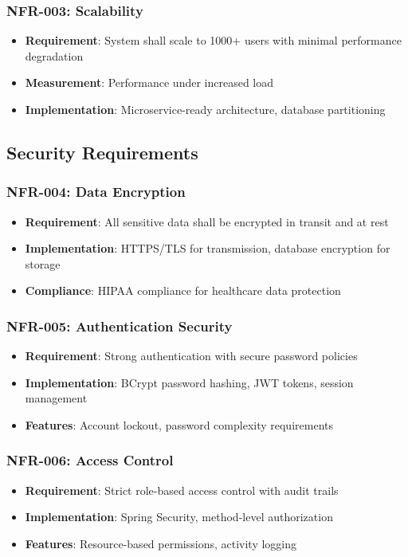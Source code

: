 \documentclass[12pt,a4paper]{article}
\begin{document}
\subsubsection{NFR-003: Scalability}
\begin{itemize}
    \item \textbf{Requirement}: System shall scale to 1000+ users with minimal performance degradation
    \item \textbf{Measurement}: Performance under increased load
    \item \textbf{Implementation}: Microservice-ready architecture, database partitioning
\end{itemize}

\subsection{Security Requirements}

\subsubsection{NFR-004: Data Encryption}
\begin{itemize}
    \item \textbf{Requirement}: All sensitive data shall be encrypted in transit and at rest
    \item \textbf{Implementation}: HTTPS/TLS for transmission, database encryption for storage
    \item \textbf{Compliance}: HIPAA compliance for healthcare data protection
\end{itemize}

\subsubsection{NFR-005: Authentication Security}
\begin{itemize}
    \item \textbf{Requirement}: Strong authentication with secure password policies
    \item \textbf{Implementation}: BCrypt password hashing, JWT tokens, session management
    \item \textbf{Features}: Account lockout, password complexity requirements
\end{itemize}

\subsubsection{NFR-006: Access Control}
\begin{itemize}
    \item \textbf{Requirement}: Strict role-based access control with audit trails
    \item \textbf{Implementation}: Spring Security, method-level authorization
    \item \textbf{Features}: Resource-based permissions, activity logging
\end{itemize}
\end{document}
